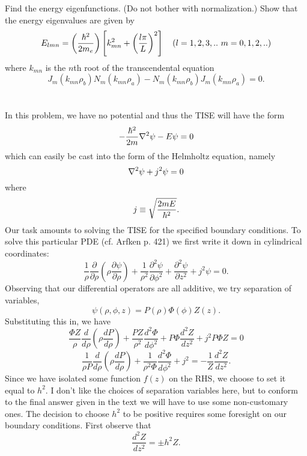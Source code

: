 \documentclass[11pt,letterpaper]{article}
\begin{document}
	 \benum
	 	\item
		Find the energy eigenfunctions. (Do not bother with normalization.) Show that the energy eigenvalues are given by 
                \[
                		E_{lmn} = \left(\frac{\h^2}{2m_e}\right)\left[k^2_{mn}+\left(\frac{l\pi}{L}\right)^2\right]\quad(l=1,2,3,..\ m=0,1,2,..)
		\]
                where $k_{mn}$ is the $n$th root of the transcendental equation
                \[
                		J_m(k_{mn}\rho_b)N_m(k_{mn}\rho_a)-N_m(k_{mn}\rho_b)J_m(k_{mn}\rho_a)=0.
		\]
                \\ 
                \\ 
                In this problem, we have no potential and thus the TISE will have the form
                \[
                		-\frac{\hbar^2}{2m}\nabla^2\psi -E\psi = 0
		\]
                which can easily be cast into the form of the Helmholtz equation, namely
                \[
                		\nabla^2\psi +j^2\psi = 0
		\]
                where 
                \[
                		j\equiv \sqrt{\frac{2mE}{\hbar^2}}.
		\]
                Our task amounts to solving the TISE for the specified boundary conditions. To solve this particular PDE (cf. Arfken p. 421) we first 
                write it down in cylindrical coordinates:
                \[
                		\frac 1\rho \frac{\partial}{\partial \rho}\left(\rho\frac{\partial \psi}{\partial\rho}\right)+\frac{1}{\rho^2}\frac{\partial^2\psi}{\partial
			\phi^2}+ \frac{\partial^2\psi}{\partial z^2}+j^2\psi = 0.
		\]
                Observing that our differential operators are all additive, we try separation of variables,
                \[
                		\psi(\rho,\phi,z) = P(\rho)\Phi(\phi)Z(z).
		\]
                Substituting this in, we have
                \[
                		\frac {\Phi Z}{\rho} \frac{d}{d \rho}\left(\rho\frac{dP}{d\rho}\right)+\frac{PZ}{\rho^2}\frac{d^2\Phi}{d\phi^2}+P\Phi\frac{d^2Z}
			{dz^2}+j^2P\Phi Z = 0
		\]
                \[
                		\frac{1}{\rho P}\frac{d}{d\rho}\left(\rho\frac{dP}{d\rho}\right)+\frac{1}{\rho^2\Phi}\frac{d^2\Phi}{d\phi^2}+j^2 = -\frac{1}{Z}
			\frac{d^2Z}{dz^2}.
		\]
                Since we have isolated some function $f(z)$ on the RHS, we choose to set it equal to $h^2$. I don't like the choices of separation 
                variables here, but to conform to the final answer given in the text we will have to use some non-customary ones. The decision to 
                choose $h^2$ to be positive requires some foresight on our boundary conditions. First observe that 
                \[
                		\frac{d^2Z}{dz^2} = \pm h^2Z.
		\]
\end{document}
